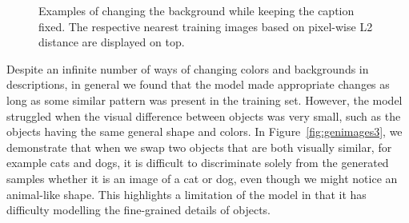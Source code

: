 \documentclass{article} %
\begin{document}
\begin{figure}[!h]
\begin{center}
%
\quad
%
\end{center}
\caption{Examples of changing the background while keeping the caption fixed. The respective nearest training images based on pixel-wise L2 distance are displayed on top.}
\label{fig:genimages2}
\vspace{-0.3cm}
\end{figure}

Despite an infinite number of ways of changing colors and backgrounds in descriptions, in general we found that the model made appropriate changes as long as some similar pattern was present in the training set. However, the model struggled when the visual difference between objects was very small, such as the objects having the same general shape and colors. In Figure~\ref{fig:genimages3}, we demonstrate that when we swap two objects that are both visually similar, for example cats and dogs, it is difficult to discriminate solely from the generated samples whether it is an image of a cat or dog, even though we might notice an animal-like shape. This highlights a limitation of the model in that it has difficulty modelling the fine-grained details of objects. 
 
\end{document}
